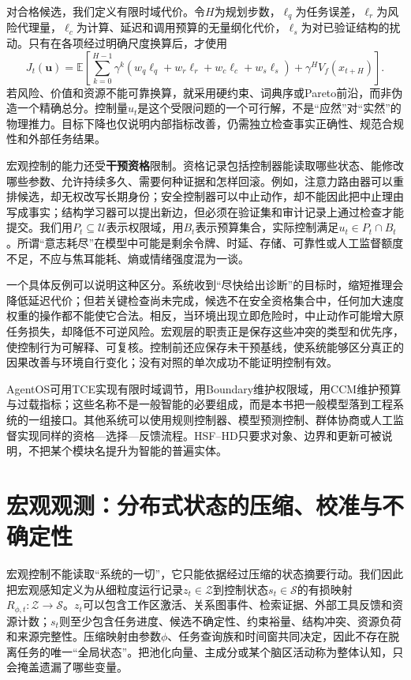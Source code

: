 对合格候选，我们定义有限时域代价。令$H$为规划步数，$\ell_q$为任务误差，$\ell_r$为风险代理量，$\ell_c$为计算、延迟和调用预算的无量纲化代价，$\ell_s$为对已验证结构的扰动。只有在各项经过明确尺度换算后，才使用
\[
J_t(\mathbf{u})=\mathbb{E}\!\left[\sum_{k=0}^{H-1}\gamma^k
(w_q\ell_q+w_r\ell_r+w_c\ell_c+w_s\ell_s)+\gamma^H V_f(x_{t+H})\right].
\]
若风险、价值和资源不能可靠换算，就采用硬约束、词典序或Pareto前沿，而非伪造一个精确总分。控制量$u_t$是这个受限问题的一个可行解，不是“应然”对“实然”的物理推力。目标下降也仅说明内部指标改善，仍需独立检查事实正确性、规范合规性和外部任务结果。

宏观控制的能力还受\textbf{干预资格}限制。资格记录包括控制器能读取哪些状态、能修改哪些参数、允许持续多久、需要何种证据和怎样回滚。例如，注意力路由器可以重排候选，却无权改写长期身份；安全控制器可以中止动作，却不能因此把中止理由写成事实；结构学习器可以提出新边，但必须在验证集和审计记录上通过检查才能提交。我们用$P_t\subseteq\mathcal{U}$表示权限域，用$B_t$表示预算集合，实际控制满足$u_t\in P_t\cap B_t$。所谓“意志耗尽”在模型中可能是剩余令牌、时延、存储、可靠性或人工监督额度不足，不应与焦耳能耗、熵或情绪强度混为一谈。

一个具体反例可以说明这种区分。系统收到“尽快给出诊断”的目标时，缩短推理会降低延迟代价；但若关键检查尚未完成，候选不在安全资格集合中，任何加大速度权重的操作都不能使它合法。相反，当环境出现立即危险时，中止动作可能增大原任务损失，却降低不可逆风险。宏观层的职责正是保存这些冲突的类型和优先序，使控制行为可解释、可复核。控制前还应保存未干预基线，使系统能够区分真正的因果改善与环境自行变化；没有对照的单次成功不能证明控制有效。

AgentOS可用TCE实现有限时域调节，用Boundary维护权限域，用CCM维护预算与过载指标；这些名称不是一般智能的必要组成，而是本书把一般模型落到工程系统的一组接口。其他系统可以使用规则控制器、模型预测控制、群体协商或人工监督实现同样的资格—选择—反馈流程。HSF--HD只要求对象、边界和更新可被说明，不把某个模块名提升为智能的普遍实体。

\section{宏观观测：分布式状态的压缩、校准与不确定性}
\label{sec:section_9106}

宏观控制不能读取“系统的一切”，它只能依据经过压缩的状态摘要行动。我们因此把宏观感知定义为从细粒度运行记录$z_t\in\mathcal{Z}$到控制状态$s_t\in\mathcal{S}$的有损映射$R_{\phi,t}:\mathcal{Z}\rightarrow\mathcal{S}$。$z_t$可以包含工作区激活、关系图事件、检索证据、外部工具反馈和资源计数；$s_t$则至少包含任务进度、候选不确定性、约束裕量、结构冲突、资源负荷和来源完整性。压缩映射由参数$\phi$、任务查询族和时间窗共同决定，因此不存在脱离任务的唯一“全局状态”。把池化向量、主成分或某个脑区活动称为整体认知，只会掩盖遗漏了哪些变量。

